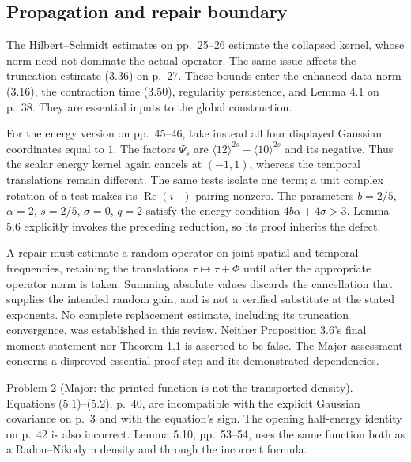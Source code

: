 \documentclass[10pt]{article}
\begin{document}
\subsection*{Propagation and repair boundary}
The Hilbert–Schmidt estimates on pp. 25–26 estimate the collapsed kernel, whose norm need not dominate the actual operator. The same issue affects the truncation estimate (3.36) on p. 27. These bounds enter the enhanced-data norm (3.16), the contraction time (3.50), regularity persistence, and Lemma 4.1 on p. 38. They are essential inputs to the global construction.\par
For the energy version on pp. 45–46, take instead all four displayed Gaussian coordinates equal to \(1\). The factors \(\Psi_s\) are \(\langle 12\rangle^{2s}-\langle 10\rangle^{2s}\) and its negative. Thus the scalar energy kernel again cancels at \((-1,1)\), whereas the temporal translations remain different. The same tests isolate one term; a unit complex rotation of a test makes its \(\operatorname{Re}(i\,\cdot)\) pairing nonzero. The parameters \(b=2/5\), \(\alpha=2\), \(s=2/5\), \(\sigma=0\), \(q=2\) satisfy the energy condition \(4b\alpha+4\sigma>3\). Lemma 5.6 explicitly invokes the preceding reduction, so its proof inherits the defect.\par
A repair must estimate a random operator on joint spatial and temporal frequencies, retaining the translations \(\tau\mapsto\tau+\Phi\) until after the appropriate operator norm is taken. Summing absolute values discards the cancellation that supplies the intended random gain, and is not a verified substitute at the stated exponents. No complete replacement estimate, including its truncation convergence, was established in this review. Neither Proposition 3.6’s final moment statement nor Theorem 1.1 is asserted to be false. The Major assessment concerns a disproved essential proof step and its demonstrated dependencies.\par
Problem 2 (Major: the printed function is not the transported density).  Equations (5.1)–(5.2), p. 40, are incompatible with the explicit Gaussian covariance on p. 3 and with the equation’s sign. The opening half-energy identity on p. 42 is also incorrect. Lemma 5.10, pp. 53–54, uses the same function both as a Radon–Nikodym density and through the incorrect formula.\par
\end{document}
